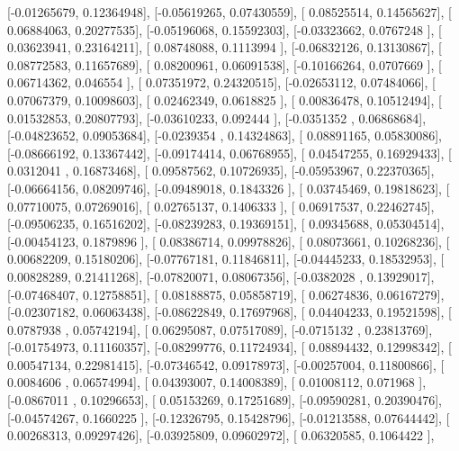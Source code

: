 \documentclass{article}
\begin{document}
       [-0.01265679,  0.12364948],
       [-0.05619265,  0.07430559],
       [ 0.08525514,  0.14565627],
       [ 0.06884063,  0.20277535],
       [-0.05196068,  0.15592303],
       [-0.03323662,  0.0767248 ],
       [ 0.03623941,  0.23164211],
       [ 0.08748088,  0.1113994 ],
       [-0.06832126,  0.13130867],
       [ 0.08772583,  0.11657689],
       [ 0.08200961,  0.06091538],
       [-0.10166264,  0.0707669 ],
       [ 0.06714362,  0.046554  ],
       [ 0.07351972,  0.24320515],
       [-0.02653112,  0.07484066],
       [ 0.07067379,  0.10098603],
       [ 0.02462349,  0.0618825 ],
       [ 0.00836478,  0.10512494],
       [ 0.01532853,  0.20807793],
       [-0.03610233,  0.092444  ],
       [-0.0351352 ,  0.06868684],
       [-0.04823652,  0.09053684],
       [-0.0239354 ,  0.14324863],
       [ 0.08891165,  0.05830086],
       [-0.08666192,  0.13367442],
       [-0.09174414,  0.06768955],
       [ 0.04547255,  0.16929433],
       [ 0.0312041 ,  0.16873468],
       [ 0.09587562,  0.10726935],
       [-0.05953967,  0.22370365],
       [-0.06664156,  0.08209746],
       [-0.09489018,  0.1843326 ],
       [ 0.03745469,  0.19818623],
       [ 0.07710075,  0.07269016],
       [ 0.02765137,  0.1406333 ],
       [ 0.06917537,  0.22462745],
       [-0.09506235,  0.16516202],
       [-0.08239283,  0.19369151],
       [ 0.09345688,  0.05304514],
       [-0.00454123,  0.1879896 ],
       [ 0.08386714,  0.09978826],
       [ 0.08073661,  0.10268236],
       [ 0.00682209,  0.15180206],
       [-0.07767181,  0.11846811],
       [-0.04445233,  0.18532953],
       [ 0.00828289,  0.21411268],
       [-0.07820071,  0.08067356],
       [-0.0382028 ,  0.13929017],
       [-0.07468407,  0.12758851],
       [ 0.08188875,  0.05858719],
       [ 0.06274836,  0.06167279],
       [-0.02307182,  0.06063438],
       [-0.08622849,  0.17697968],
       [ 0.04404233,  0.19521598],
       [ 0.0787938 ,  0.05742194],
       [ 0.06295087,  0.07517089],
       [-0.0715132 ,  0.23813769],
       [-0.01754973,  0.11160357],
       [-0.08299776,  0.11724934],
       [ 0.08894432,  0.12998342],
       [ 0.00547134,  0.22981415],
       [-0.07346542,  0.09178973],
       [-0.00257004,  0.11800866],
       [ 0.0084606 ,  0.06574994],
       [ 0.04393007,  0.14008389],
       [ 0.01008112,  0.071968  ],
       [-0.0867011 ,  0.10296653],
       [ 0.05153269,  0.17251689],
       [-0.09590281,  0.20390476],
       [-0.04574267,  0.1660225 ],
       [-0.12326795,  0.15428796],
       [-0.01213588,  0.07644442],
       [ 0.00268313,  0.09297426],
       [-0.03925809,  0.09602972],
       [ 0.06320585,  0.1064422 ],
\end{document}
